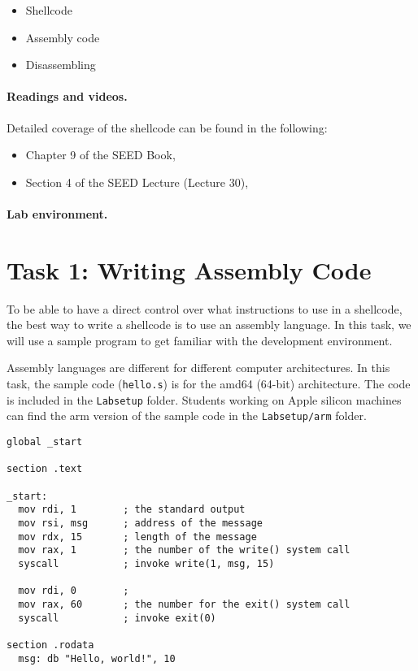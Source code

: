 \begin{itemize}[noitemsep]
\item Shellcode
\item Assembly code
\item Disassembling 
\end{itemize}


\paragraph{Readings and videos.}
Detailed coverage of the shellcode can be found in the following:

\begin{itemize}
\item Chapter 9 of the SEED Book, \seedbook
\item Section 4 of the SEED Lecture (Lecture 30), \seedcsvideo
\end{itemize}


\paragraph{Lab environment.} \seedenvironmentC





\section{Task 1: Writing Assembly Code} 

To be able to have a direct control over what instructions
to use in a shellcode, the best way to write a shellcode
is to use an assembly language. In this task, we will use 
a sample program to get familiar with the development
environment. 

Assembly languages are different for different computer architectures. 
In this task, the sample code (\texttt{hello.s})  
is for the amd64 (64-bit) architecture. The code is included in
the \texttt{Labsetup} folder. Students working on Apple silicon
machines can find the arm version of the sample code in
the \texttt{Labsetup/arm} folder.  


\begin{lstlisting}[caption={A sample amd64 assembly program (\texttt{hello.s})}]
global _start

section .text

_start:
  mov rdi, 1        ; the standard output
  mov rsi, msg      ; address of the message
  mov rdx, 15       ; length of the message
  mov rax, 1        ; the number of the write() system call
  syscall           ; invoke write(1, msg, 15)

  mov rdi, 0        ;
  mov rax, 60       ; the number for the exit() system call
  syscall           ; invoke exit(0)

section .rodata
  msg: db "Hello, world!", 10
\end{lstlisting}
 
